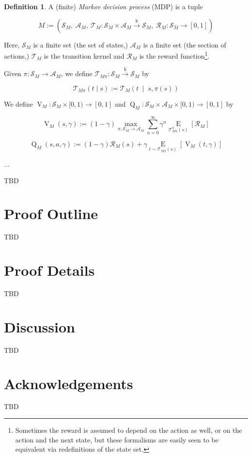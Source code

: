 \documentclass[11pt]{article}
\theoremstyle{definition}
\newtheorem{definition}{Definition}%
\theoremstyle{plain}
\newcommand{\AP}[1]{\left(#1\right)}
\newcommand{\AB}[1]{\left[#1\right]}
\newcommand{\APM}[2]{\left(#1\;\middle\vert\;#2\right)}
\newcommand{\Ea}[2]{\underset{#1}{\operatorname{E}}\AB{#2}}
\newcommand{\K}{\xrightarrow{\text{k}}}
\newcommand{\A}{\mathcal{A}}
\newcommand{\St}{\mathcal{S}}
\newcommand{\T}{\mathcal{T}}
\newcommand{\R}{\mathcal{R}}
\newcommand{\V}{\operatorname{V}}
\newcommand{\Q}{\operatorname{Q}}
\begin{document}
\begin{samepage}
\begin{definition}

A (finite) \emph{Markov decision process} (MDP) is a tuple

$$M:=\AP{\St_M,\ \A_M,\ \T_M: \St_M \times \A_M \K \St_M,\ \R_M: \St_M \rightarrow [0,1]}$$

Here, $\St_M$ is a finite set (the set of states,) $\A_M$ is a finite set (the section of actions,) $\T_M$ is the transition kernel and $\R_M$ is the reward function\footnote{Sometimes the reward is assumed to depend on the action as well, or on the action and the next state, but these formalisms are easily seen to be equivalent via redefinitions of the state set.}.

Given $\pi: \St_M \rightarrow \A_M$, we define $\T_{M\pi}: \St_M \K \St_M$ by

\begin{equation}
\T_{M\pi}(t \mid s) := \T_M\APM{t}{s,\pi(s)}
\end{equation}

We define $\V_M : \St_M \times [0,1) \rightarrow [0,1]$ and $\Q_M: \St_M \times \A_M \times [0,1) \rightarrow [0,1]$ by

\begin{equation}
\V_M(s,\gamma):=(1-\gamma) \max_{\pi: \St_M \rightarrow \A_M} \sum_{n=0}^\infty \gamma^n \Ea{\T_{M\pi}^n(s)}{\R_M}
\end{equation}

\begin{equation}
\Q_M(s,a,\gamma):=(1-\gamma)\R_M(s)+\gamma\Ea{t \sim \T_{M\pi}(s)}{\V_M(t,\gamma)}
\end{equation}

...

\end{definition}
\end{samepage}

TBD

\section{Proof Outline}

TBD

\section{Proof Details}

TBD

\section{Discussion}

TBD

\section*{Acknowledgements}

TBD



\end{document}
